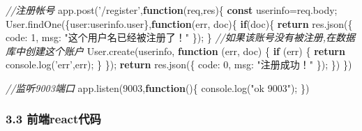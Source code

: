 \documentclass[]{article}
\newenvironment{Shaded}{}{}
\newcommand{\AttributeTok}[1]{\textcolor[rgb]{0.49,0.56,0.16}{#1}}
\newcommand{\CommentTok}[1]{\textcolor[rgb]{0.38,0.63,0.69}{\textit{#1}}}
\newcommand{\ControlFlowTok}[1]{\textcolor[rgb]{0.00,0.44,0.13}{\textbf{#1}}}
\newcommand{\DataTypeTok}[1]{\textcolor[rgb]{0.56,0.13,0.00}{#1}}
\newcommand{\DecValTok}[1]{\textcolor[rgb]{0.25,0.63,0.44}{#1}}
\newcommand{\KeywordTok}[1]{\textcolor[rgb]{0.00,0.44,0.13}{\textbf{#1}}}
\newcommand{\NormalTok}[1]{#1}
\newcommand{\OperatorTok}[1]{\textcolor[rgb]{0.40,0.40,0.40}{#1}}
\newcommand{\StringTok}[1]{\textcolor[rgb]{0.25,0.44,0.63}{#1}}
\newcommand{\VariableTok}[1]{\textcolor[rgb]{0.10,0.09,0.49}{#1}}
\begin{document}
\begin{Shaded}
\begin{Highlighting}[]
\CommentTok{//注册帐号}
\VariableTok{app}\NormalTok{.}\AttributeTok{post}\NormalTok{(}\StringTok{'/register'}\OperatorTok{,}\KeywordTok{function}\NormalTok{(req}\OperatorTok{,}\NormalTok{res)}\OperatorTok{\{}
  \KeywordTok{const}\NormalTok{ userinfo}\OperatorTok{=}\VariableTok{req}\NormalTok{.}\AttributeTok{body}\OperatorTok{;}
  \VariableTok{User}\NormalTok{.}\AttributeTok{findOne}\NormalTok{(}\OperatorTok{\{}\DataTypeTok{user}\OperatorTok{:}\VariableTok{userinfo}\NormalTok{.}\AttributeTok{user}\OperatorTok{\},}\KeywordTok{function}\NormalTok{(err}\OperatorTok{,}\NormalTok{ doc)}\OperatorTok{\{}
    \ControlFlowTok{if}\NormalTok{(doc)}\OperatorTok{\{}
      \ControlFlowTok{return} \VariableTok{res}\NormalTok{.}\AttributeTok{json}\NormalTok{(}\OperatorTok{\{}
        \DataTypeTok{code}\OperatorTok{:} \DecValTok{1}\OperatorTok{,}
        \DataTypeTok{msg}\OperatorTok{:} \StringTok{"这个用户名已经被注册了！"}
      \OperatorTok{\}}\NormalTok{)}\OperatorTok{;}
    \OperatorTok{\}}
    \CommentTok{//如果该账号没有被注册,在数据库中创建这个账户}
    \VariableTok{User}\NormalTok{.}\AttributeTok{create}\NormalTok{(userinfo}\OperatorTok{,} \KeywordTok{function}\NormalTok{ (err}\OperatorTok{,}\NormalTok{ doc) }\OperatorTok{\{}
      \ControlFlowTok{if}\NormalTok{ (err) }\OperatorTok{\{}
        \ControlFlowTok{return} \VariableTok{console}\NormalTok{.}\AttributeTok{log}\NormalTok{(}\StringTok{'err'}\OperatorTok{,}\NormalTok{err)}\OperatorTok{;}
      \OperatorTok{\}}
    \OperatorTok{\}}\NormalTok{)}\OperatorTok{;}
    \ControlFlowTok{return} \VariableTok{res}\NormalTok{.}\AttributeTok{json}\NormalTok{(}\OperatorTok{\{}
      \DataTypeTok{code}\OperatorTok{:} \DecValTok{0}\OperatorTok{,}
      \DataTypeTok{msg}\OperatorTok{:} \StringTok{"注册成功！"}
    \OperatorTok{\}}\NormalTok{)}\OperatorTok{;}
  \OperatorTok{\}}\NormalTok{)}
\OperatorTok{\}}\NormalTok{)}


\CommentTok{//监听9003端口}
\VariableTok{app}\NormalTok{.}\AttributeTok{listen}\NormalTok{(}\DecValTok{9003}\OperatorTok{,}\KeywordTok{function}\NormalTok{()}\OperatorTok{\{}
  \VariableTok{console}\NormalTok{.}\AttributeTok{log}\NormalTok{(}\StringTok{"ok 9003"}\NormalTok{)}\OperatorTok{;}
\OperatorTok{\}}\NormalTok{)}
\end{Highlighting}
\end{Shaded}

\hypertarget{header-n175}{%
\subsubsection{3.3 前端react代码}\label{header-n175}}
\end{document}
